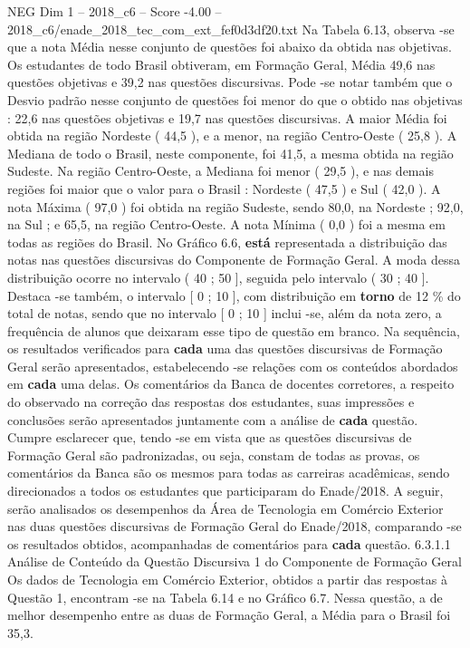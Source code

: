 \begin{textsample}{NEG Dim 1 – 2018\_c6 – Score -4.00 – 2018\_c6/enade\_2018\_tec\_com\_ext\_fef0d3df20.txt}
Na Tabela 6.13, observa -se que a nota Média nesse conjunto de questões foi abaixo da obtida nas objetivas.
Os estudantes de todo Brasil obtiveram, em Formação Geral, Média 49,6 nas questões objetivas e 39,2 nas questões discursivas.
Pode -se notar também que o Desvio padrão nesse conjunto de questões foi menor do que o obtido nas objetivas : 22,6 nas questões objetivas e 19,7 nas questões discursivas.
A maior Média foi obtida na região Nordeste ( 44,5 ), e a menor, na região Centro-Oeste ( 25,8 ).
A Mediana de todo o Brasil, neste componente, foi 41,5, a mesma obtida na região Sudeste.
Na região Centro-Oeste, a Mediana foi menor ( 29,5 ), e nas demais regiões foi maior que o valor para o Brasil : Nordeste ( 47,5 ) e Sul ( 42,0 ).
A nota Máxima ( 97,0 ) foi obtida na região Sudeste, sendo 80,0, na Nordeste ; 92,0, na Sul ; e 65,5, na região Centro-Oeste.
A nota Mínima ( 0,0 ) foi a mesma em todas as regiões do Brasil.
No Gráfico 6.6, \textbf{está} representada a distribuição das notas nas questões discursivas do Componente de Formação Geral.
A moda dessa distribuição ocorre no intervalo ( 40 ; 50 ], seguida pelo intervalo ( 30 ; 40 ].
Destaca -se também, o intervalo [ 0 ; 10 ], com distribuição em \textbf{torno} de 12 \% do total de notas, sendo que no intervalo [ 0 ; 10 ] inclui -se, além da nota zero, a frequência de alunos que deixaram esse tipo de questão em branco.
Na sequência, os resultados verificados para \textbf{cada} uma das questões discursivas de Formação Geral serão apresentados, estabelecendo -se relações com os conteúdos abordados em \textbf{cada} uma delas.
Os comentários da Banca de docentes corretores, a respeito do observado na correção das respostas dos estudantes, suas impressões e conclusões serão apresentados juntamente com a análise de \textbf{cada} questão.
Cumpre esclarecer que, tendo -se em vista que as questões discursivas de Formação Geral são padronizadas, ou seja, constam de todas as provas, os comentários da Banca são os mesmos para todas as carreiras acadêmicas, sendo direcionados a todos os estudantes que participaram do Enade/2018.
A seguir, serão analisados os desempenhos da Área de Tecnologia em Comércio Exterior nas duas questões discursivas de Formação Geral do Enade/2018, comparando -se os resultados obtidos, acompanhadas de comentários para \textbf{cada} questão. 6.3.1.1 Análise de Conteúdo da Questão Discursiva 1 do Componente de Formação Geral Os dados de Tecnologia em Comércio Exterior, obtidos a partir das respostas à Questão 1, encontram -se na Tabela 6.14 e no Gráfico 6.7.
Nessa questão, a de melhor desempenho entre as duas de Formação Geral, a Média para o Brasil foi 35,3.

\end{textsample}
